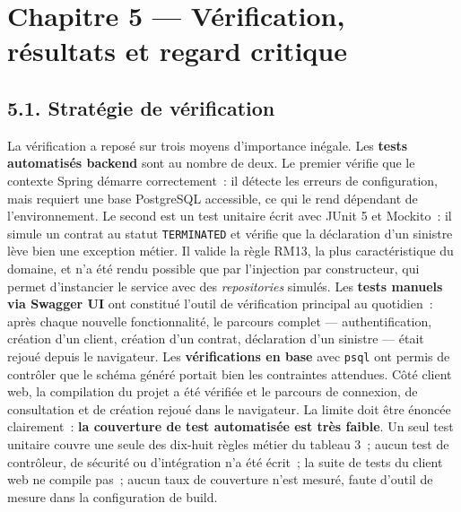 \documentclass[12pt,a4paper]{report}
\begin{document}
\chapter*{Chapitre 5 — Vérification, résultats et regard critique}
\section*{5.1. Stratégie de vérification}
La vérification a reposé sur trois moyens d'importance inégale.
Les \textbf{tests automatisés backend} sont au nombre de deux. Le premier vérifie que le contexte Spring démarre correctement~: il détecte les erreurs de configuration, mais requiert une base PostgreSQL accessible, ce qui le rend dépendant de l'environnement. Le second est un test unitaire écrit avec JUnit 5 et Mockito~: il simule un contrat au statut \texttt{TERMINATED} et vérifie que la déclaration d'un sinistre lève bien une exception métier. Il valide la règle RM13, la plus caractéristique du domaine, et n'a été rendu possible que par l'injection par constructeur, qui permet d'instancier le service avec des \textit{repositories} simulés.
Les \textbf{tests manuels via Swagger UI} ont constitué l'outil de vérification principal au quotidien~: après chaque nouvelle fonctionnalité, le parcours complet — authentification, création d'un client, création d'un contrat, déclaration d'un sinistre — était rejoué depuis le navigateur. Les \textbf{vérifications en base} avec \texttt{psql} ont permis de contrôler que le schéma généré portait bien les contraintes attendues. Côté client web, la compilation du projet a été vérifiée et le parcours de connexion, de consultation et de création rejoué dans le navigateur.
La limite doit être énoncée clairement~: \textbf{la couverture de test automatisée est très faible}. Un seul test unitaire couvre une seule des dix-huit règles métier du tableau 3~; aucun test de contrôleur, de sécurité ou d'intégration n'a été écrit~; la suite de tests du client web ne compile pas~; aucun taux de couverture n'est mesuré, faute d'outil de mesure dans la configuration de build.
\end{document}
